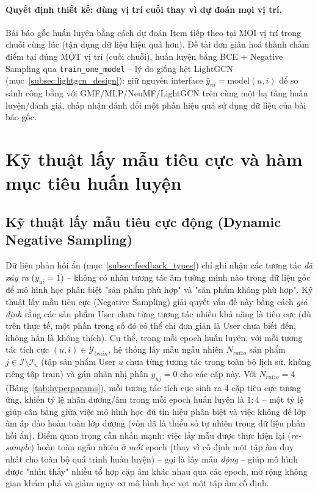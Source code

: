 \paragraph{Quyết định thiết kế: dùng vị trí cuối thay vì dự đoán mọi vị trí.} Bài báo gốc huấn luyện bằng cách dự đoán Item tiếp theo tại MỌI vị trí trong chuỗi cùng lúc (tận dụng dữ liệu hiệu quả hơn). Đề tài đơn giản hoá thành chấm điểm tại đúng MỘT vị trí (cuối chuỗi), huấn luyện bằng BCE + Negative Sampling qua \texttt{train\_one\_model} -- lý do giống hệt LightGCN (mục~\ref{subsec:lightgcn_design}): giữ nguyên interface $\hat{y}_{ui}=\text{model}(u,i)$ để so sánh công bằng với GMF/MLP/NeuMF/LightGCN trên cùng một hạ tầng huấn luyện/đánh giá, chấp nhận đánh đổi một phần hiệu quả sử dụng dữ liệu của bài báo gốc.

\section{Kỹ thuật lấy mẫu tiêu cực và hàm mục tiêu huấn luyện}
\label{sec:sampling_loss}

\subsection{Kỹ thuật lấy mẫu tiêu cực động (Dynamic Negative Sampling)}
\label{subsec:dynamic_sampling}

Dữ liệu phản hồi ẩn (mục~\ref{subsec:feedback_types}) chỉ ghi nhận các tương tác \emph{đã xảy ra} ($y_{ui}=1$) -- không có nhãn tương tác âm tường minh nào trong dữ liệu gốc để mô hình học phân biệt "sản phẩm phù hợp" và "sản phẩm không phù hợp". Kỹ thuật lấy mẫu tiêu cực (Negative Sampling) giải quyết vấn đề này bằng cách \emph{giả định} rằng các sản phẩm User chưa từng tương tác nhiều khả năng là tiêu cực (dù trên thực tế, một phần trong số đó có thể chỉ đơn giản là User chưa biết đến, không hẳn là không thích). Cụ thể, trong mỗi epoch huấn luyện, với mỗi tương tác tích cực $(u, i) \in \mathcal{Y}_{train}$, hệ thống lấy mẫu ngẫu nhiên $N_{ratio}$ sản phẩm $j \in \mathcal{I} \setminus \mathcal{I}_u$ (tập sản phẩm User $u$ chưa từng tương tác trong toàn bộ lịch sử, không riêng tập train) và gán nhãn nhị phân $y_{uj} = 0$ cho các cặp này. Với $N_{ratio}=4$ (Bảng~\ref{tab:hyperparams}), mỗi tương tác tích cực sinh ra 4 cặp tiêu cực tương ứng, khiến tỷ lệ nhãn dương/âm trong mỗi epoch huấn luyện là $1{:}4$ -- một tỷ lệ giúp cân bằng giữa việc mô hình học đủ tín hiệu phân biệt và việc không để lớp âm áp đảo hoàn toàn lớp dương (vốn đã là thiểu số tự nhiên trong dữ liệu phản hồi ẩn). Điểm quan trọng cần nhấn mạnh: việc lấy mẫu được thực hiện lại (\textit{re-sample}) hoàn toàn ngẫu nhiên ở \emph{mỗi} epoch (thay vì cố định một tập âm duy nhất cho toàn bộ quá trình huấn luyện) -- gọi là lấy mẫu \emph{động} -- giúp mô hình được "nhìn thấy" nhiều tổ hợp cặp âm khác nhau qua các epoch, mở rộng không gian khám phá và giảm nguy cơ mô hình học vẹt một tập âm cố định.

